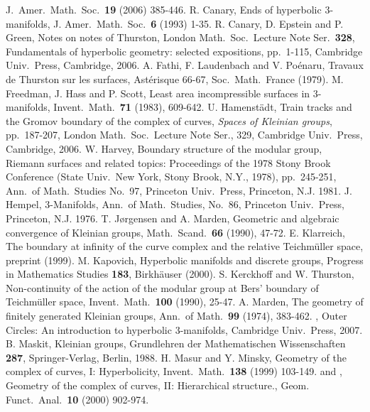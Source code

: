 \documentclass{amsart}
\theoremstyle{definition}
\numberwithin{figure}{section}
\numberwithin{equation}{section}
\begin{document}
\begin{thebibliography}{99}
J.~Amer.\ Math.\ Soc.\ {\bf 19} (2006) 385-446.
 R. Canary, Ends of hyperbolic $3$-manifolds, J. Amer.\ Math.\ Soc.\ {\bf 6} (1993) 1-35.
 R. Canary, D. Epstein and P. Green, Notes on notes of Thurston, London Math.\ Soc.\ Lecture Note Ser.\ {\bf 328},  Fundamentals of hyperbolic geometry: selected expositions, pp.\ 1-115, Cambridge Univ.\ Press, Cambridge, 2006.
 A. Fathi, F. Laudenbach and V. Po\'{e}naru, Travaux de Thurston sur les surfaces, Ast\'{e}risque 66-67, Soc.\ Math.\ France (1979).
 M. Freedman, J. Hass and P. Scott, Least area incompressible surfaces in $3$-manifolds, Invent.\ 
Math.\ {\bf 71} (1983), 609-642.
 U. Hamenst\"{a}dt, Train tracks and the Gromov boundary of the complex of curves, 
{\em Spaces of Kleinian groups}, pp.\ 187-207, London Math.\ Soc.\ Lecture Note Ser., 329, Cambridge Univ.\ Press, 
Cambridge, 2006.
 W. Harvey, Boundary structure of the modular group,  Riemann surfaces and related topics: 
Proceedings of the 1978 Stony Brook Conference (State Univ.\ New York, Stony Brook, N.Y., 1978), pp.\ 245-251, 
Ann.\ of Math.\ Studies No.\ 97, Princeton Univ.\ Press, Princeton, N.J. 1981.
\bibitem[He]{he} J. Hempel, $3$-Manifolds, Ann.\ of Math.\ Studies, No.\ 86, Princeton Univ.\ Press, Princeton, 
N.J. 1976.
 T. J{\o}rgensen and A. Marden, Geometric and algebraic convergence of Kleinian groups, Math.\ Scand.\ {\bf 66} (1990), 47-72.
\bibitem[Kla]{kla} E. Klarreich, The boundary at infinity of the curve complex and the relative Teichm\"{u}ller 
space, preprint (1999).
 M. Kapovich, Hyperbolic manifolds and discrete groups, Progress in Mathematics Studies {\bf 183}, Birkh\"{a}user (2000).
\bibitem[KT]{kt} S. Kerckhoff and W. Thurston, Non-continuity of the action of the modular group at Bers' boundary of Teichm\"uller space, Invent.\ Math.\ {\bf 100} (1990), 25-47.
\bibitem[Ma1]{ma1} A. Marden, The geometry of finitely generated Kleinian groups, Ann.\ of Math.\ {\bf 99} (1974), 383-462.
\bibitem[Ma2]{ma2} \bysame, Outer Circles: An introduction to hyperbolic $3$-manifolds, Cambridge Univ.\ Press, 
2007.
 B. Maskit, Kleinian groups, Grundlehren der Mathematischen Wissenschaften {\bf 287},  Springer-Verlag, Berlin, 1988.
\bibitem[MM1]{mm1} H. Masur and Y. Minsky, Geometry of the complex of curves, I: Hyperbolicity, Invent.\ Math.\ 
{\bf 138} (1999) 103-149. 
\bibitem[MM2]{mm2} \bysame and \bysame, Geometry of the complex of curves, II: Hierarchical structure., 
Geom. Funct.\ Anal.\ {\bf 10} (2000) 902-974.

\end{thebibliography}
\end{document}
